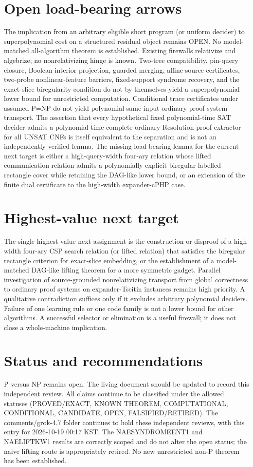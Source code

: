 \documentclass[11pt]{article}
\begin{document}
\section{Open load-bearing arrows}
The implication from an arbitrary eligible short program (or uniform decider) to superpolynomial cost on a structured residual object remains OPEN. No model-matched all-algorithm theorem is established. Existing firewalls relativize and algebrize; no nonrelativizing hinge is known. Two-tree compatibility, pin-query closure, Boolean-interior projection, guarded merging, affine-source certificates, two-probe nonlinear-feature barriers, fixed-support syndrome recovery, and the exact-slice biregularity condition do not by themselves yield a superpolynomial lower bound for unrestricted computation. Conditional trace certificates under assumed P=NP do not yield polynomial same-input ordinary proof-system transport. The assertion that every hypothetical fixed polynomial-time SAT decider admits a polynomial-time complete ordinary Resolution proof extractor for all UNSAT CNFs is itself equivalent to the separation and is not an independently verified lemma. The missing load-bearing lemma for the current next target is either a high-query-width four-ary relation whose lifted communication relation admits a polynomially explicit biregular labelled rectangle cover while retaining the DAG-like lower bound, or an extension of the finite dual certificate to the high-width expander-cPHP case.

\section{Highest-value next target}
The single highest-value next assignment is the construction or disproof of a high-width four-ary CSP search relation (or lifted relation) that satisfies the biregular rectangle criterion for exact-slice embedding, or the establishment of a model-matched DAG-like lifting theorem for a more symmetric gadget. Parallel investigation of source-grounded nonrelativizing transport from global correctness to ordinary proof systems on expander-Tseitin instances remains high priority. A qualitative contradiction suffices only if it excludes arbitrary polynomial deciders. Failure of one learning rule or one code family is not a lower bound for other algorithms. A successful selector or elimination is a useful firewall; it does not close a whole-machine implication.

\section{Status and recommendations}
P versus NP remains open. The living document should be updated to record this independent review. All claims continue to be classified under the allowed statuses (PROVED/EXACT, KNOWN THEOREM, COMPUTATIONAL, CONDITIONAL, CANDIDATE, OPEN, FALSIFIED/RETIRED). The comments/grok-4.7 folder continues to hold these independent reviews, with this entry for 2026-10-19 00:17 KST. The NAESYNDROMEENT1 and NAELIFTKW1 results are correctly scoped and do not alter the open status; the naive lifting route is appropriately retired. No new unrestricted non-P theorem has been established.

\end{document}
